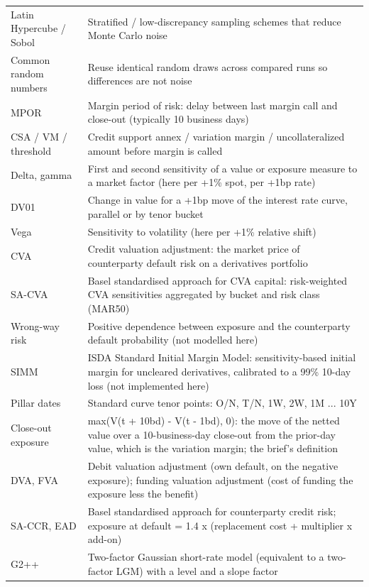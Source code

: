 \documentclass[11pt,letterpaper]{article}
\begin{document}
{\begin{longtable}{>{\raggedright\arraybackslash}p{}>{\raggedright\arraybackslash}p{}}
Latin Hypercube / Sobol & Stratified / low-discrepancy sampling schemes that reduce Monte Carlo noise \\
\rowcolor{gray!9}Common random numbers & Reuse identical random draws across compared runs so differences are not noise \\
MPOR & Margin period of risk: delay between last margin call and close-out (typically 10 business days) \\
\rowcolor{gray!9}CSA / VM / threshold & Credit support annex / variation margin / uncollateralized amount before margin is called \\
Delta, gamma & First and second sensitivity of a value or exposure measure to a market factor (here per +1\% spot, per +1bp rate) \\
\rowcolor{gray!9}DV01 & Change in value for a +1bp move of the interest rate curve, parallel or by tenor bucket \\
Vega & Sensitivity to volatility (here per +1\% relative shift) \\
\rowcolor{gray!9}CVA & Credit valuation adjustment: the market price of counterparty default risk on a derivatives portfolio \\
SA-CVA & Basel standardised approach for CVA capital: risk-weighted CVA sensitivities aggregated by bucket and risk class (MAR50) \\
\rowcolor{gray!9}Wrong-way risk & Positive dependence between exposure and the counterparty default probability (not modelled here) \\
SIMM & ISDA Standard Initial Margin Model: sensitivity-based initial margin for uncleared derivatives, calibrated to a 99\% 10-day loss (not implemented here) \\
\rowcolor{gray!9}Pillar dates & Standard curve tenor points: O/N, T/N, 1W, 2W, 1M ... 10Y \\
Close-out exposure & max(V(t + 10bd) - V(t - 1bd), 0): the move of the netted value over a 10-business-day close-out from the prior-day value, which is the variation margin; the brief's definition \\
\rowcolor{gray!9}DVA, FVA & Debit valuation adjustment (own default, on the negative exposure); funding valuation adjustment (cost of funding the exposure less the benefit) \\
SA-CCR, EAD & Basel standardised approach for counterparty credit risk; exposure at default = 1.4 x (replacement cost + multiplier x add-on) \\
\rowcolor{gray!9}G2++ & Two-factor Gaussian short-rate model (equivalent to a two-factor LGM) with a level and a slope factor \\

\end{longtable}}
\end{document}
